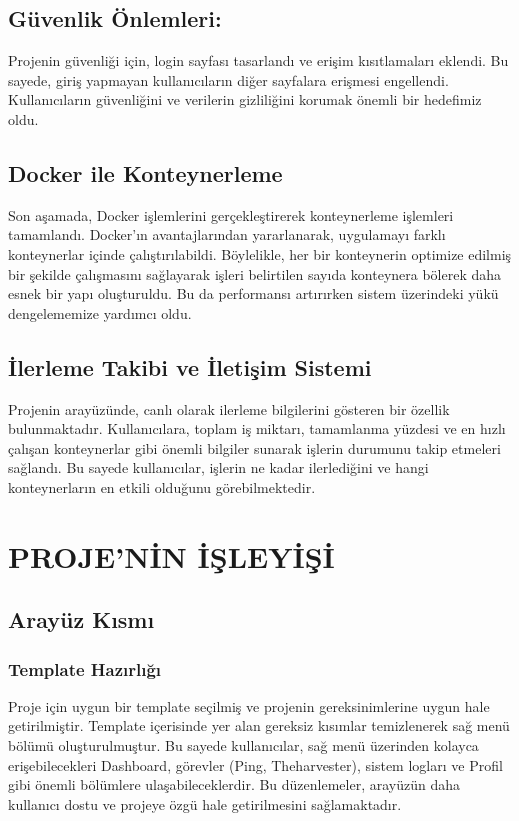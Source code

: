 \subsection{Güvenlik Önlemleri:}
Projenin güvenliği için, login sayfası tasarlandı ve erişim kısıtlamaları eklendi. Bu sayede, giriş yapmayan kullanıcıların diğer sayfalara erişmesi engellendi. Kullanıcıların güvenliğini ve verilerin gizliliğini korumak önemli bir hedefimiz oldu.
\subsection{Docker ile Konteynerleme}
Son aşamada, Docker işlemlerini gerçekleştirerek konteynerleme işlemleri tamamlandı. Docker'ın avantajlarından yararlanarak, uygulamayı farklı konteynerlar içinde çalıştırılabildi. Böylelikle, her bir konteynerin optimize edilmiş bir şekilde çalışmasını sağlayarak işleri belirtilen sayıda konteynera bölerek daha esnek bir yapı oluşturuldu. Bu da performansı artırırken sistem üzerindeki yükü dengelememize yardımcı oldu.
\subsection{İlerleme Takibi ve İletişim Sistemi}
Projenin arayüzünde, canlı olarak ilerleme bilgilerini gösteren bir özellik bulunmaktadır. Kullanıcılara, toplam iş miktarı, tamamlanma yüzdesi ve en hızlı çalışan konteynerlar gibi önemli bilgiler sunarak işlerin durumunu takip etmeleri sağlandı. Bu sayede kullanıcılar, işlerin ne kadar ilerlediğini ve hangi konteynerların en etkili olduğunu görebilmektedir.


\section{PROJE'NİN İŞLEYİŞİ}
\subsection{Arayüz Kısmı }
\subsubsection{Template Hazırlığı}
Proje için uygun bir template seçilmiş ve projenin gereksinimlerine uygun hale getirilmiştir. Template içerisinde yer alan gereksiz kısımlar temizlenerek sağ menü bölümü oluşturulmuştur. Bu sayede kullanıcılar, sağ menü üzerinden kolayca erişebilecekleri Dashboard, görevler (Ping, Theharvester), sistem logları ve Profil gibi önemli bölümlere ulaşabileceklerdir. Bu düzenlemeler, arayüzün daha kullanıcı dostu ve projeye özgü hale getirilmesini sağlamaktadır.
